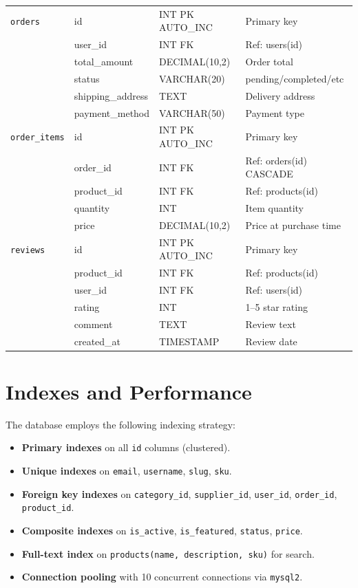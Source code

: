 \documentclass[12pt,a4paper]{report}
\begin{document}
\begin{longtable}{|l|l|l|p{5cm}|}
\texttt{orders} & id & INT PK AUTO\_INC & Primary key \\
 & user\_id & INT FK & Ref: users(id) \\
 & total\_amount & DECIMAL(10,2) & Order total \\
 & status & VARCHAR(20) & pending/completed/etc \\
 & shipping\_address & TEXT & Delivery address \\
 & payment\_method & VARCHAR(50) & Payment type \\
\hline

\texttt{order\_items} & id & INT PK AUTO\_INC & Primary key \\
 & order\_id & INT FK & Ref: orders(id) CASCADE \\
 & product\_id & INT FK & Ref: products(id) \\
 & quantity & INT & Item quantity \\
 & price & DECIMAL(10,2) & Price at purchase time \\
\hline

\texttt{reviews} & id & INT PK AUTO\_INC & Primary key \\
 & product\_id & INT FK & Ref: products(id) \\
 & user\_id & INT FK & Ref: users(id) \\
 & rating & INT & 1--5 star rating \\
 & comment & TEXT & Review text \\
 & created\_at & TIMESTAMP & Review date \\
\hline

\end{longtable}

\section{Indexes and Performance}
The database employs the following indexing strategy:
\begin{itemize}[noitemsep]
  \item \textbf{Primary indexes} on all \texttt{id} columns (clustered).
  \item \textbf{Unique indexes} on \texttt{email}, \texttt{username}, \texttt{slug}, \texttt{sku}.
  \item \textbf{Foreign key indexes} on \texttt{category\_id}, \texttt{supplier\_id}, \texttt{user\_id}, \texttt{order\_id}, \texttt{product\_id}.
  \item \textbf{Composite indexes} on \texttt{is\_active}, \texttt{is\_featured}, \texttt{status}, \texttt{price}.
  \item \textbf{Full-text index} on \texttt{products(name, description, sku)} for search.
  \item \textbf{Connection pooling} with 10 concurrent connections via \texttt{mysql2}.
\end{itemize}
\end{document}
